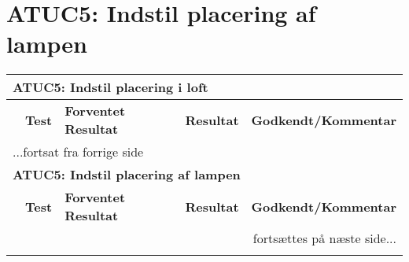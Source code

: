 \section{ATUC5: Indstil placering af lampen}

\begin{center} \centering
    \begin{longtable}{|p{}|p{}|p{}|p{}|p{}|}
    \hline
        \multicolumn{5}{|l|}{\textbf{ATUC5: Indstil placering i loft}} \\ \hline
        \multicolumn{1}{|c|}{} &
        \textbf{Test} &
        \textbf{Forventet \newline Resultat} &
        \textbf{Resultat} &
        \textbf{Godkendt\slash \newline Kommentar} \\ \hline 
        \endfirsthead

        \multicolumn{5}{l}{...fortsat fra forrige side} \\ \hline 
        \multicolumn{5}{|l|}{\textbf{ATUC5: Indstil placering af lampen}} \\ \hline
        \multicolumn{1}{|c|}{} &
        \textbf{Test} &
        \textbf{Forventet \newline Resultat} &
        \textbf{Resultat} &
        \textbf{Godkendt\slash \newline Kommentar} \\ \hline 
        \endhead

        \multicolumn{5}{r}{fortsættes på næste side...} \\
        \endfoot
        \endlastfoot
        

\end{longtable}
\end{center}
